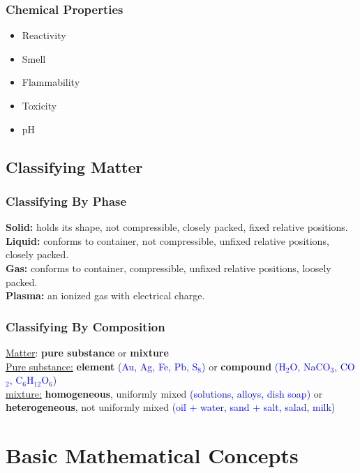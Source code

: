\documentclass[a4paper, 12pt]{article}
\begin{document}
\subsubsection{Chemical Properties}
\begin{itemize}[leftmargin=*, nosep]
    \item Reactivity
    \item Smell
    \item Flammability
    \item Toxicity
    \item pH
\end{itemize}

\subsection{Classifying Matter}

\subsubsection{Classifying By Phase}
\textbf{Solid:} holds its shape, not compressible, closely packed, fixed relative positions.
\\
\textbf{Liquid:} conforms to container, not compressible, unfixed relative positions, closely packed.
\\
\textbf{Gas:} conforms to container, compressible, unfixed relative positions, loosely packed.
\\
\textbf{Plasma:} an ionized gas with electrical charge. 

\subsubsection{Classifying By Composition}
\underline{Matter}: \textbf{pure substance} or \textbf{mixture}
\\
\underline{Pure substance:} \textbf{element} \textcolor{blue}{(Au, Ag, Fe, Pb, S$_8$)} or \textbf{compound} \textcolor{blue}{(H$_2$O, NaCO$_3$, CO$_2$, C$_6$H$_{\text{12}}$O$_6$)}
\\
\underline{mixture:} \textbf{homogeneous}, uniformly mixed \textcolor{blue}{(solutions, alloys, dish soap)} or \textbf{heterogeneous}, not uniformly mixed \textcolor{blue}{(oil + water, sand + salt, salad, milk)}

\section{Basic Mathematical Concepts}
\end{document}
